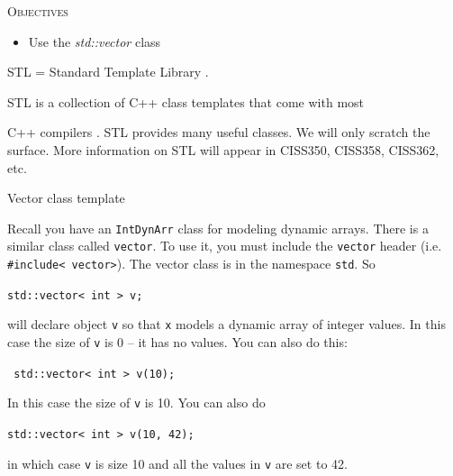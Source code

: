 \newpage{}

\textsc{Objectives}

\begin{itemize}
\item
  Use the \emph{std::vector} class
\end{itemize}

\newpage{}

STL = Standard Template Library .

STL is a collection of C++ class templates that come with most

C++ compilers . STL provides many useful classes. We will only scratch
the surface. More information on STL will appear in CISS350, CISS358,
CISS362, etc.

Vector class template

Recall you have an \texttt{IntDynArr} class for modeling dynamic arrays.
There is a similar class called \texttt{vector}. To use it, you must include the \texttt{vector} header (i.e. \verb!#include< vector>!). The vector class is in the namespace \texttt{std}. So
\begin{center}
\verb!std::vector< int > v;!
\end{center}
will declare object \texttt{v} so that \texttt{x} models a dynamic array of
integer values. In this case the size of \texttt{v} is 0 -- it has no
values. You can also do this:
\begin{center}
\texttt{ std::vector< int > v(10);}
\end{center}
In this case the size of \texttt{v} is 10. You can also do
\begin{center}
\texttt{std::vector< int > v(10, 42);}
\end{center}
in which case \texttt{v} is size 10 and all the values in \texttt{v} are set
to 42.


\newpage{}

